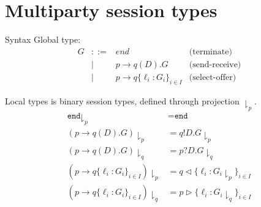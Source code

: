 \section{Multiparty session types}

\begin{frame}{Syntax}
  Global type:
  $$\begin{array}{lclr}
      G & ::= & end                                      & \text{(terminate)}    \\
        & |   & p\rightarrow q(D).G                      & \text{(send-receive)} \\
        & |   & p\rightarrow q \{\ell_i : G_i\}_{i\in I} & \text{(select-offer)}
    \end{array}$$

  Local types is binary session types, defined through projection $\downharpoonright_p$.
  \begin{align*}
    \texttt{end} \downharpoonright_p                              & = \texttt{end}             \\
    (p\rightarrow q(D).G)\downharpoonright_p                      & = q!D.G\downharpoonright_p \\
    (p\rightarrow q(D).G)\downharpoonright_q                      & = p?D.G\downharpoonright_q \\
    (p\rightarrow q \{\ell_i : G_i\}_{i\in I})\downharpoonright_p & =
    q \triangleleft   \{\ell_i : G_i\downharpoonright_p     \}_{i\in I}                        \\
    (p\rightarrow q \{\ell_i : G_i\}_{i\in I})\downharpoonright_q & =
    p \triangleright \{\ell_i : G_i\downharpoonright_q     \}_{i\in I}                         \\
  \end{align*}
\end{frame}